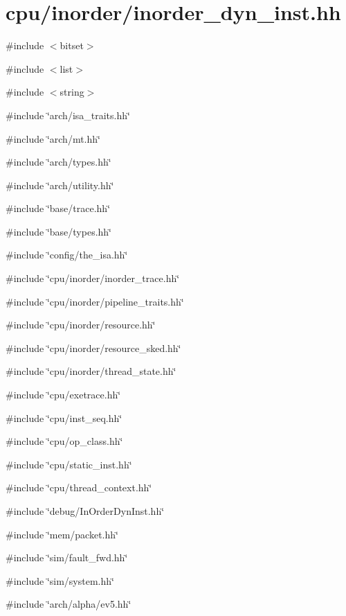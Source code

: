 \hypertarget{inorder__dyn__inst_8hh}{
\section{cpu/inorder/inorder\_\-dyn\_\-inst.hh}
\label{inorder__dyn__inst_8hh}
}
{\ttfamily \#include $<$bitset$>$}\par
{\ttfamily \#include $<$list$>$}\par
{\ttfamily \#include $<$string$>$}\par
{\ttfamily \#include \char`\"{}arch/isa\_\-traits.hh\char`\"{}}\par
{\ttfamily \#include \char`\"{}arch/mt.hh\char`\"{}}\par
{\ttfamily \#include \char`\"{}arch/types.hh\char`\"{}}\par
{\ttfamily \#include \char`\"{}arch/utility.hh\char`\"{}}\par
{\ttfamily \#include \char`\"{}base/trace.hh\char`\"{}}\par
{\ttfamily \#include \char`\"{}base/types.hh\char`\"{}}\par
{\ttfamily \#include \char`\"{}config/the\_\-isa.hh\char`\"{}}\par
{\ttfamily \#include \char`\"{}cpu/inorder/inorder\_\-trace.hh\char`\"{}}\par
{\ttfamily \#include \char`\"{}cpu/inorder/pipeline\_\-traits.hh\char`\"{}}\par
{\ttfamily \#include \char`\"{}cpu/inorder/resource.hh\char`\"{}}\par
{\ttfamily \#include \char`\"{}cpu/inorder/resource\_\-sked.hh\char`\"{}}\par
{\ttfamily \#include \char`\"{}cpu/inorder/thread\_\-state.hh\char`\"{}}\par
{\ttfamily \#include \char`\"{}cpu/exetrace.hh\char`\"{}}\par
{\ttfamily \#include \char`\"{}cpu/inst\_\-seq.hh\char`\"{}}\par
{\ttfamily \#include \char`\"{}cpu/op\_\-class.hh\char`\"{}}\par
{\ttfamily \#include \char`\"{}cpu/static\_\-inst.hh\char`\"{}}\par
{\ttfamily \#include \char`\"{}cpu/thread\_\-context.hh\char`\"{}}\par
{\ttfamily \#include \char`\"{}debug/InOrderDynInst.hh\char`\"{}}\par
{\ttfamily \#include \char`\"{}mem/packet.hh\char`\"{}}\par
{\ttfamily \#include \char`\"{}sim/fault\_\-fwd.hh\char`\"{}}\par
{\ttfamily \#include \char`\"{}sim/system.hh\char`\"{}}\par
{\ttfamily \#include \char`\"{}arch/alpha/ev5.hh\char`\"{}}\par
